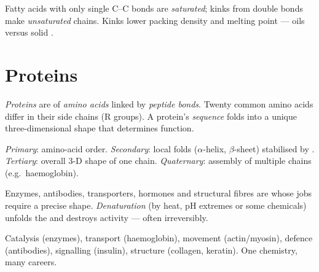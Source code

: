 \begin{remark}\label{rem:g10:molecules-of-life:sat}
Fatty acids with only single C--C bonds are \emph{saturated}; kinks from double bonds make \emph{unsaturated} chains. Kinks lower packing density and melting point ---
oils versus solid .
\end{remark}

\section{Proteins}

\begin{definition}\label{def:g10:molecules-of-life:proteins}
\emph{Proteins} are  of \emph{amino
acids} linked by \emph{peptide bonds}. Twenty common amino acids differ in their side chains (R groups).
A protein's \emph{sequence} folds into a unique
three-dimensional shape that determines function.
\end{definition}

\begin{definition}\label{def:g10:molecules-of-life:protein-levels}
\emph{Primary}: amino-acid order. \emph{Secondary}: local folds
($\alpha$-helix, $\beta$-sheet) stabilised by .
\emph{Tertiary}: overall 3-D shape of one chain. \emph{Quaternary}:
assembly of multiple chains (e.g.\ haemoglobin).
\end{definition}

\begin{proposition}\label{prop:g10:molecules-of-life:shape}
Enzymes, antibodies, transporters, hormones and structural fibres are
 whose jobs require a precise shape. \emph{Denaturation}
(by heat, pH extremes or some chemicals) unfolds the  and destroys
activity --- often irreversibly.
\end{proposition}
\admitted

\begin{example}[Roles]\label{ex:g10:molecules-of-life:protein-roles}
Catalysis (enzymes), transport (haemoglobin), movement (actin/myosin),
defence (antibodies), signalling (insulin), structure (collagen,
keratin). One chemistry, many careers.
\end{example}

